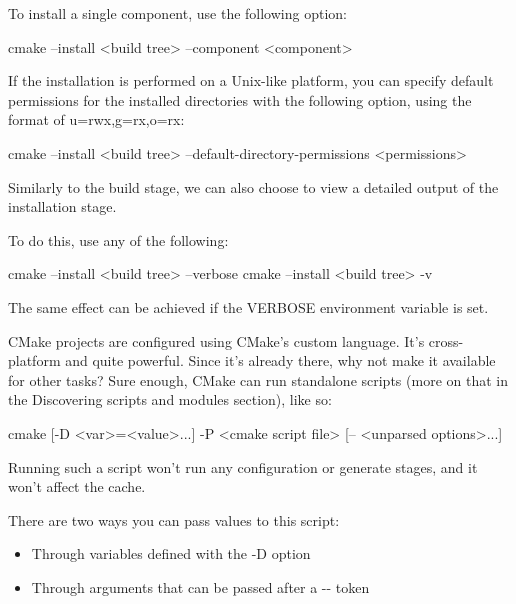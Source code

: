 To install a single component, use the following option:

\begin{shell}
cmake --install <build tree> --component <component>
\end{shell}


If the installation is performed on a Unix-like platform, you can specify default permissions for the installed directories with the following option, using the format of u=rwx,g=rx,o=rx:

\begin{shell}
cmake --install <build tree>
      --default-directory-permissions <permissions>
\end{shell}


Similarly to the build stage, we can also choose to view a detailed output of the installation stage.

To do this, use any of the following:

\begin{shell}
cmake --install <build tree> --verbose
cmake --install <build tree> -v
\end{shell}

The same effect can be achieved if the VERBOSE environment variable is set.


CMake projects are configured using CMake’s custom language. It’s cross-platform and quite powerful. Since it’s already there, why not make it available for other tasks? Sure enough, CMake can run standalone scripts (more on that in the Discovering scripts and modules section), like so:

\begin{shell}
cmake [{-D <var>=<value>}...] -P <cmake script file>
      [-- <unparsed options>...]
\end{shell}

Running such a script won’t run any configuration or generate stages, and it won’t affect the cache.

There are two ways you can pass values to this script:

\begin{itemize}
\item
Through variables defined with the -D option

\item
Through arguments that can be passed after a -{}- token
\end{itemize}

